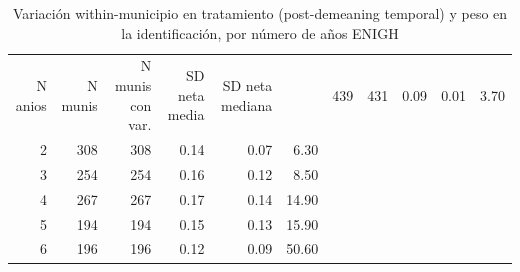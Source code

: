 \begin{table}[ht]
\centering
\caption{Variación within-municipio en tratamiento (post-demeaning temporal) y peso en la identificación, por número de años ENIGH} 
\label{tab:id_ID2_variacion_within_tratamiento}
\begin{tabular}{rrrrrr}
  \toprule
N anios & N munis & N munis con var. & SD neta media & SD neta mediana & %
   & 439 & 431 & 0.09 & 0.01 & 3.70 \\ 
    2 & 308 & 308 & 0.14 & 0.07 & 6.30 \\ 
    3 & 254 & 254 & 0.16 & 0.12 & 8.50 \\ 
    4 & 267 & 267 & 0.17 & 0.14 & 14.90 \\ 
    5 & 194 & 194 & 0.15 & 0.13 & 15.90 \\ 
    6 & 196 & 196 & 0.12 & 0.09 & 50.60 \\ 
   \bottomrule
\end{tabular}
\end{table}
